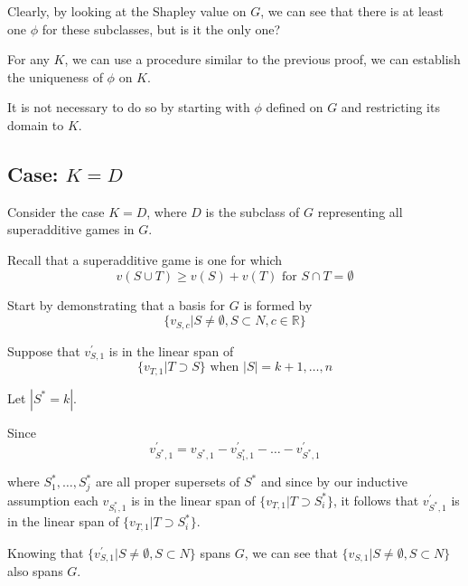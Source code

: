 \documentclass[
paper=128mm:96mm, %
fontsize=11pt, %
pagesize, %
parskip=half-, %
]{scrartcl} %
\theoremstyle{mythmstyle} %
\begin{document}
Clearly, by looking at the Shapley value on $G$, we can see that there is at least one $\phi$ for these subclasses, but is it the only one?

For any $K$, we can use a procedure similar to the previous proof, we can establish the uniqueness of $\phi$ on $K$.

It is not necessary to do so by starting with $\phi$ defined on $G$ and restricting its domain to $K$.

\clearpage

\subsection{Case: $K = D$}

Consider the case $K = D$, where $D$ is the subclass of $G$ representing all superadditive games in $G$.

Recall that a superadditive game is one for which 
	\[ v(S \cup T) \ge v(S) + v(T) \text{ for } S \cap T = \emptyset \]

\clearpage

Start by demonstrating that a basis for $G$ is formed by
	\[ \{v_{S,c} | S \neq \emptyset, S \subset N, c \in \mathbb{R} \} \]

Suppose that $v^{\prime}_{S,1}$ is in the linear span of
	\[ \{v_{T, 1}| T \supset S \} \text{ when } |S| = k + 1, \dots, n \]    

\clearpage

Let $|S^{*} = k|$.

Since
	\[ v^{\prime}_{S^{*},1} = v_{S^{*},1} - v^{\prime}_{S^{*}_{1},1} - \dots - v^{\prime}_{S^{*}_{},1} \]
    
where $S^{*}_{1}, \dots, S^{*}_{j}$ are all proper supersets of $S^{*}$ and since by our inductive assumption each $v_{S^{*}_{i},1}$ is in the linear span of $\{v_{T, 1}| T \supset S^{*}_{i} \}$, it follows that $v^{\prime}_{S^{*},1}$ is in the linear span of $\{v_{T, 1}| T \supset S^{*}_{i} \}$.

\clearpage

Knowing that $\{v^{\prime}_{S,1} | S \neq \emptyset, S \subset N \}$ spans $G$, we can see that $\{v_{S,1} | S \neq \emptyset, S \subset N \}$ also spans $G$.
\end{document}
